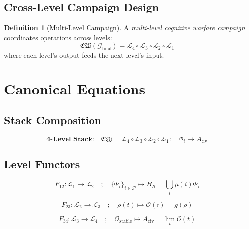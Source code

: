 \documentclass[11pt,twoside]{book}
\theoremstyle{definition}
\newtheorem{definition}{Definition}[chapter]
\theoremstyle{plain}
\theoremstyle{remark}
\newcommand{\Frac}{\Phi}
\newcommand{\CogWarStack}{\mathfrak{CW}}
\newcommand{\LevelI}{\mathcal{L}_1}
\newcommand{\LevelII}{\mathcal{L}_2}
\newcommand{\LevelIII}{\mathcal{L}_3}
\newcommand{\LevelIV}{\mathcal{L}_4}
\begin{document}
\section{Cross-Level Campaign Design}

\begin{definition}[Multi-Level Campaign]
\label{def:multi-level-campaign}
A \emph{multi-level cognitive warfare campaign} coordinates operations across levels:
\[
    \CogWarStack(\mathcal{G}_{\mathrm{final}}) = \LevelIV \circ \LevelIII \circ \LevelII \circ \LevelI
\]
where each level's output feeds the next level's input.
\end{definition}

\chapter{Canonical Equations}
\label{ch:cogwar-equations}

\section{Stack Composition}

\begin{equation}
\boxed{
    \textbf{4-Level Stack:} \quad
    \CogWarStack = \LevelIV \circ \LevelIII \circ \LevelII \circ \LevelI
    : \quad \Frac_i \to A_{\mathrm{civ}}
}
\end{equation}

\section{Level Functors}

\begin{equation}
\boxed{
    F_{12} : \LevelI \to \LevelII \quad ; \quad
    \{\Frac_i\}_{i \in \mathcal{P}} \mapsto H_{\mathcal{S}} = \bigcup_i \mu(i) \Frac_i
}
\end{equation}

\begin{equation}
\boxed{
    F_{23} : \LevelII \to \LevelIII \quad ; \quad
    \rho(t) \mapsto \mathcal{O}(t) = g(\rho)
}
\end{equation}

\begin{equation}
\boxed{
    F_{34} : \LevelIII \to \LevelIV \quad ; \quad
    \mathcal{O}_{\mathrm{stable}} \mapsto A_{\mathrm{civ}} = \lim_t \mathcal{O}(t)
}
\end{equation}

\end{document}
